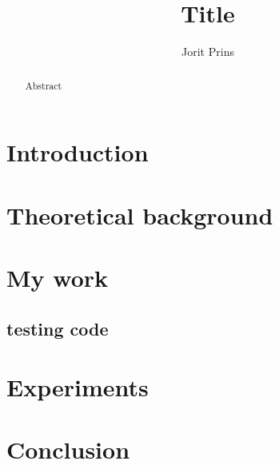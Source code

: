 \documentclass[twoside]{Style/uva-inf-bachelor-thesis}
\title{Title}
\author{Jorit Prins}
\begin{document}
\maketitle

\begin{abstract}
Abstract
\end{abstract}

\tableofcontents

\chapter{Introduction}


\chapter{Theoretical background}


\chapter{My work}
\section{testing code}

\chapter{Experiments}
% 
% 


\chapter{Conclusion}


\printbibliography
\end{document}
